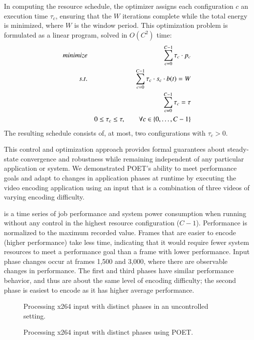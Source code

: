 In computing the resource schedule, the optimizer assigns each configuration $c$ an execution time $\tau_c$, ensuring that the $W$ iterations complete while the total energy is minimized, where $W$ is the window period.
This optimization problem is formulated as a linear program, solved in $O(C^2)$ time:
\begin{eqnarray}
\minimize && \sum_{c=0}^{C-1} \tau_c \cdot p_c \label{eqn:poet-power} \\
\st %
&& \sum_{c=0}^{C-1} \tau_c \cdot s_c \cdot b(t) = W \label{eqn:poet-work} \\
&& \sum_{c=0}^{C-1} \tau_c =  \tau \label{eqn:poet-deadline} \\
&& 0 \le \tau_c \le \tau, \qquad \forall c \in \{0,\ldots,C-1\} \label{eqn:poet-time}
\end{eqnarray}
The resulting schedule consists of, at most, two configurations with $\tau_c > 0$.

This control and optimization approach provides formal guarantees about steady-state convergence and robustness while remaining independent of any particular application or system.
We demonstrated POET's ability to meet performance goals and adapt to changes in application phases at runtime by executing the  video encoding application using an input that is a combination of three videos of varying encoding difficulty.

 is a time series of job performance and system power consumption when running  without any control in the highest resource configuration ($C-1$).
Performance is normalized to the maximum recorded value.
Frames that are easier to encode (higher performance) take less time, indicating that it would require fewer system resources to meet a performance goal than a frame with lower performance.
Input phase changes occur at frames 1,500 and 3,000, where there are observable changes in performance.
The first and third phases have similar performance behavior, and thus are about the same level of encoding difficulty; the second phase is easiest to encode as it has higher average performance.

\begin{figure}[t]
  
  \caption{Processing x264 input with distinct phases in an uncontrolled setting.}
  \label{fig:poet-phases-default}
\end{figure}

\begin{figure}[t]
  
  \caption{Processing x264 input with distinct phases using POET.}
  \label{fig:poet-phases-x264}
\end{figure}


